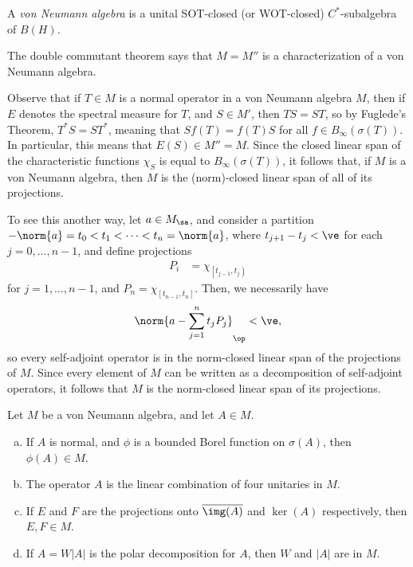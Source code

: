 \documentclass[10pt]{mypackage}
\begin{document}
\begin{definition}
  A \textit{von Neumann algebra} is a unital SOT-closed (or WOT-closed) $C^{\ast}$-subalgebra of $B(H)$.
\end{definition}
The double commutant theorem says that $M = M''$ is a characterization of a von Neumann algebra.

Observe that if $T\in M$ is a normal operator in a von Neumann algebra $M$, then if $E$ denotes the spectral measure for $T$, and $S\in M'$, then $TS = ST$, so by Fuglede's Theorem, $T^{\ast}S = ST^{\ast}$, meaning that $Sf(T) = f(T)S$ for all $f\in B_{\infty}\left(\sigma(T)\right)$. In particular, this means that $E(S)\in M'' = M$. Since the closed linear span of the characteristic functions $\chi_{S}$ is equal to $B_{\infty}\left(\sigma(T)\right)$, it follows that, if $M$ is a von Neumann algebra, then $M$ is the (norm)-closed linear span of all of its projections.

To see this another way, let $a\in M_{\sa}$, and consider a partition $-\norm{a} = t_0 < t_1 < \cdots < t_n = \norm{a}$, where $t_{j+1}-t_j < \ve$ for each $j = 0,\dots,n-1$, and define projections
\begin{align*}
  P_i &= \chi_{\left[ t_{j-1},t_j \right)}
\end{align*}
for $j=1,\dots,n-1$, and $P_n = \chi_{\left[ t_{n-1},t_n \right]}$. Then, we necessarily have
\begin{align*}
  \norm{a - \sum_{j=1}^{n}t_jP_j}_{\op} < \ve,
\end{align*}
so every self-adjoint operator is in the norm-closed linear span of the projections of $M$. Since every element of $M$ can be written as a decomposition of self-adjoint operators, it follows that $M$ is the norm-closed linear span of its projections.
\begin{proposition}
  Let $M$ be a von Neumann algebra, and let $A\in M$.
  \begin{enumerate}[(a)]
    \item If $A$ is normal, and $\phi$ is a bounded Borel function on $\sigma(A)$, then $\phi(A) \in M$.
    \item The operator $A$ is the linear combination of four unitaries in $M$.
    \item If $E$ and $F$ are the projections onto $ \overline{\img(A)} $ and $\ker (A)$ respectively, then $E,F\in M$.
    \item If $A = W \left\vert A \right\vert$ is the polar decomposition for $A$, then $W$ and $ \left\vert A \right\vert $ are in $M$.
  \end{enumerate}
\end{proposition}
\end{document}
